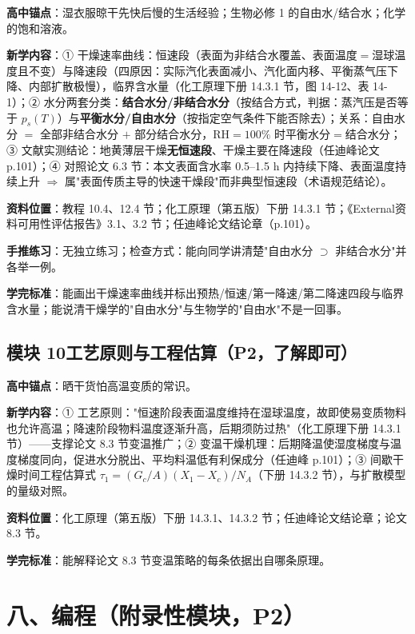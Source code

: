 \documentclass[12pt,a4paper]{ctexart}
\begin{document}
\textbf{高中锚点}：湿衣服晾干先快后慢的生活经验；生物必修 1 的自由水/结合水；化学的饱和溶液。

\textbf{新学内容}：① 干燥速率曲线：恒速段（表面为非结合水覆盖、表面温度$=$湿球温度且不变）与降速段（四原因：实际汽化表面减小、汽化面内移、平衡蒸气压下降、内部扩散极慢），临界含水量（化工原理下册 14.3.1 节，图 14-12、表 14-1）；② 水分两套分类：\textbf{结合水分/非结合水分}（按结合方式，判据：蒸汽压是否等于 $p_s(T)$）与\textbf{平衡水分/自由水分}（按指定空气条件下能否除去）；关系：自由水分 $=$ 全部非结合水分 $+$ 部分结合水分，RH$=100\%$ 时平衡水分$=$结合水分；③ 文献实测结论：地黄薄层干燥\textbf{无恒速段}、干燥主要在降速段（任迪峰论文 p.101）；④ 对照论文 6.3 节：本文表面含水率 0.5--1.5 h 内持续下降、表面温度持续上升 $\Rightarrow$ 属"表面传质主导的快速干燥段"而非典型恒速段（术语规范结论）。

\textbf{资料位置}：教程 10.4、12.4 节；化工原理（第五版）下册 14.3.1 节；《External资料可用性评估报告》3.1、3.2 节；任迪峰论文结论章（p.101）。

\textbf{手推练习}：无独立练习；检查方式：能向同学讲清楚"自由水分 $\supset$ 非结合水分"并各举一例。

\textbf{学完标准}：能画出干燥速率曲线并标出预热/恒速/第一降速/第二降速四段与临界含水量；能说清干燥学的"自由水分"与生物学的"自由水"不是一回事。

\subsection{模块 10\quad 工艺原则与工程估算（P2，了解即可）}

\textbf{高中锚点}：晒干货怕高温变质的常识。

\textbf{新学内容}：① 工艺原则："恒速阶段表面温度维持在湿球温度，故即使易变质物料也允许高温；降速阶段物料温度逐渐升高，后期须防过热"（化工原理下册 14.3.1 节）——支撑论文 8.3 节变温推广；② 变温干燥机理：后期降温使湿度梯度与温度梯度同向，促进水分脱出、平均料温低有利保成分（任迪峰 p.101）；③ 间歇干燥时间工程估算式 $\tau_1=(G_c/A)(X_1-X_c)/N_A$（下册 14.3.2 节），与扩散模型的量级对照。

\textbf{资料位置}：化工原理（第五版）下册 14.3.1、14.3.2 节；任迪峰论文结论章；论文 8.3 节。

\textbf{学完标准}：能解释论文 8.3 节变温策略的每条依据出自哪条原理。

\section{八、编程（附录性模块，P2）}
\end{document}
